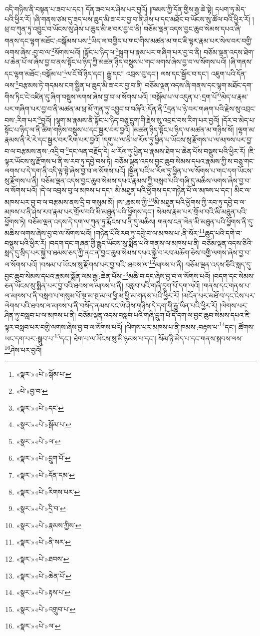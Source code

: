 འདི་གཉིས་ནི་བསྟན་པ་ཟབ་པ་དང་། དོན་ཟབ་པར་ཤེས་པར་བྱའོ། །ཁམས་ཀྱི་དོན་གྱིས་རྒྱ་ཆེ་སྟེ། དཔག་ཏུ་མེད་པའི་ཕྱིར་རོ། །ཞི་གནས་ཙམ་དུ་ཟད་པས་ཆུད་མི་ཟ་བར་བྱ་བ་ནི་ཤེས་པ་དང་མཐོང་བ་ཡོངས་སུ་ཚོལ་བའི་ཕྱིར་རོ། །ཕྲ་བ་ཀུན་ཏུ་འབྱུང་བ་ཡོངས་སུ་ཤེས་པ་ཆུད་མི་ཟ་བར་བྱ་བ་ནི། བཅོམ་ལྡན་འདས་བྱང་ཆུབ་སེམས་དཔའ་ཞི་གནས་དང་ལྷག་མཐོང་:བསྒོམས་པས་\footnote{«སྣར་»«པེ་»སྒོམ་པ་}ཡིད་ལ་བགྱིད་པ་གང་གིས་མཚན་མ་གང་ཇི་ལྟར་རྣམ་པར་སེལ་བར་བགྱི་ལགས་ཞེས་:བྱ་བ་ལ་\footnote{«པེ་»བྱ་བ་}སོགས་པའོ། །སྟོང་པ་ཉིད་ལ་\footnote{«སྣར་»«པེ་»དང་}སྐྲག་པ་རྣམ་པར་གཞིག་པར་བྱ་བ་ནི། བཅོམ་ལྡན་འདས་ཐེག་པ་ཆེན་པོ་ལ་ཞེས་བྱ་བ་ནས་སྟོང་པ་ཉིད་ཀྱི་མཚན་ཉིད་བསྡུས་པ་གང་ལགས་ཞེས་བྱ་བ་ལ་སོགས་པའོ། །ཞི་གནས་དང་ལྷག་མཐོང་:བསྒོམ་པ་\footnote{«སྣར་»«པེ་»སྒོམ་པ་}ལ་ངོ་བོ་ཉིད་དང་། རྒྱུ་དང་། འབྲས་བུ་དང་། ལས་དང་སྦྱོར་བ་དང་། འཇུག་པའི་དོན་ལས་\footnote{«སྣར་»«པེ་»ལ་}བརྩམས་ཏེ་གདམས་ངག་སྦྱིན་པ་ཆུད་མི་ཟ་བར་བྱ་བ་ནི། བཅོམ་ལྡན་འདས་ཞི་གནས་དང་ལྷག་མཐོང་དག་གིས་ཏིང་ངེ་འཛིན་དུ་ཞིག་བསྡུས་ལགས་ཞེས་བྱ་བ་ལ་སོགས་པའོ། །བསྒོམ་པ་ལ་འདུན་པ་:དྲག་པོ་\footnote{«སྣར་»«པེ་»དྲུག་པོ་}མེད་པ་རྣམ་པར་གཞིག་པར་བྱ་བ་ནི་མཚན་མ་ཕྲ་མོ་ཀུན་ཏུ་འབྱུང་བ་བཞིའི་:དོན་ནི་\footnote{«སྣར་»«པེ་»དོན་དམ་}དྲན་པ་ཉེ་བར་གཞག་པའི་རྗེས་སུ་འབྲང་བས་:རིག་པར་\footnote{«སྣར་»«པེ་»རིགས་པར་}བྱའོ། །ལྷག་མ་རྣམས་ནི་སྟོང་པ་ཉིད་བཅུ་དྲུག་གི་རྗེས་སུ་འབྲང་བས་རིག་པར་བྱའོ། །དོར་བ་མེད་པ་སྟོང་པ་ཉིད་ལ་ནི་ཚིག་གཉིས་བསྡུས་པ་དང་སྦྱར་བར་བྱའོ། །མཚན་ཉིད་སྟོང་པ་ཉིད་ལ་མཚན་མ་གཉིས་སོ། །ལྷག་མ་རྣམས་ནི་རེ་རེ་དང་སྦྱར་བར་རིག་པར་བྱའོ། །དགུ་པ་ལ་ནི་ཕ་རོལ་ཏུ་ཕྱིན་པ་ཡོངས་སུ་རྫོགས་པ་ལ་མཁས་པར་བྱ་བ་ལ་བརྩམས་ནས་:འདྲི་བ་\footnote{«སྣར་»«པེ་»དྲི་བ་}དང་ལན་བརྗོད་དེ། ཕ་རོལ་ཏུ་ཕྱིན་པ་རྣམས་ཐེག་པ་ཆེན་པོས་བསྡུས་པའི་ཕྱིར་རོ། །ཇི་ལྟར་ཡོངས་སུ་རྫོགས་པ་ནི་ས་རབ་ཏུ་དབྱེ་བས་ཏེ། བཅོམ་ལྡན་འདས་བྱང་ཆུབ་སེམས་དཔའ་རྣམས་ཀྱི་ས་བཅུ་གང་ལགས་པ་དེ་དག་ནི་འདི་ལྟ་སྟེ་ཞེས་བྱ་བ་ལ་སོགས་པའོ། །སྦྱིན་པའི་ཕ་རོལ་ཏུ་ཕྱིན་པ་ལ་སོགས་པ་གང་དག་ཡོངས་སུ་རྫོགས་པ་ནི། བཅོམ་ལྡན་འདས་བྱང་ཆུབ་སེམས་དཔའ་རྣམས་ཀྱི་བསླབ་པའི་གཞི་དུ་མཆིས་ལགས་ཞེས་བྱ་བ་ལ་སོགས་པའོ། །དེ་ལ་འབྲས་བུ་ལ་མཁས་པ་དང་། མི་མཐུན་པའི་ཕྱོགས་དང་གཉེན་པོ་ལ་མཁས་པ་དང་། མིང་ལ་མཁས་པར་བྱ་བ་ལ་བརྩམས་ནས་དྲི་བ་གསུམ་མོ། །ས་:རྣམས་ཀྱི་\footnote{«སྣར་»«པེ་»རྣམས་ཀྱིས་}མི་མཐུན་པའི་ཕྱོགས་ཀྱི་རབ་ཏུ་དབྱེ་བ་ལ་མཁས་པ་ནི་ཤེས་རབ་རྣམ་པར་གྲོལ་བའི་མི་མཐུན་པའི་ཕྱོགས་དང་། སེམས་རྣམ་པར་གྲོལ་བའི་མི་མཐུན་པའི་ཕྱོགས་ཏེ། བཅོམ་ལྡན་འདས་དེ་དག་ལ་ཀུན་ཏུ་རྨོངས་པ་ནི་དུ་མཆིས། གནས་ངན་ལེན་མི་མཐུན་པའི་ཕྱོགས་ནི་དུ་མཆིས་ལགས་ཞེས་བྱ་བ་ལ་སོགས་པའོ། །གཉེན་པོའི་རབ་ཏུ་དབྱེ་བ་ལ་མཁས་པ་:ནི་སོར་\footnote{«སྣར་»«པེ་»ནི་སར་}ཆུད་པའི་དགེ་བ་བསྡུས་པའི་ཕྱིར་རོ། །བདག་དང་གཞན་གྱི་རྒྱུད་ཡོངས་སུ་སྨིན་པའི་གནས་ལ་མཁས་པ་ནི། བཅོམ་ལྡན་འདས་ཅིའི་སླད་དུ་སྲིད་པར་སྐྱེ་བ་ཐམས་ཅད་ཀྱི་ནང་ན་བྱང་ཆུབ་སེམས་དཔའ་སྐྱེ་བ་རབ་མཆོག་ཅེས་བགྱི་ལགས་ཞེས་བྱ་བ་ལ་སོགས་པའོ། །བསམ་པ་ཡོངས་སུ་རྫོགས་པར་བྱ་བའི་:ཐབས་ལ་\footnote{«སྣར་»«པེ་»ཐབས་}མཁས་པ་ནི། བཅོམ་ལྡན་འདས་ཅིའི་སླད་དུ་བྱང་ཆུབ་སེམས་དཔའ་རྣམས་སྨོན་ལམ་རྒྱ་:ཆེན་པོས་\footnote{«སྣར་»«པེ་»ཆེན་པོ་}མཆི་བ་དང་ཞེས་བྱ་བ་ལ་སོགས་པའོ། །བདག་དང་སེམས་ཅན་ཡོངས་སུ་སྨིན་པར་བྱ་བའི་ཐབས་ལ་མཁས་པ་ནི། བསླབ་པའི་གཞི་དྲུག་པོ་དག་ལའོ། །གནས་དང་གནས་པ་ལ་མཁས་པ་ནི་བསླབ་པ་གསུམ་པོ་སྔ་མ་སྔ་མ་ལ་ཕྱི་མ་ཕྱི་མ་གནས་པའི་ཕྱིར་རོ། །མངོན་པར་མཐོ་བ་དང་ངེས་པར་ལེགས་པའི་ཐབས་ལ་མཁས་པ་ནི་བསོད་ནམས་དང་ཡེ་ཤེས་གཉིས་དེ་དག་གི་རྒྱུ་ཡིན་པའི་ཕྱིར་རོ། །ལེགས་པར་ཤིན་ཏུ་བསླབ་པ་ལ་མཁས་པ་ནི། བཅོམ་ལྡན་འདས་བསླབ་པའི་གཞི་དྲུག་པོ་དེ་དག་ལ་བྱང་ཆུབ་སེམས་དཔའ་ཇི་ལྟར་བསླབ་པར་བགྱི་ལགས་ཞེས་བྱ་བ་ལ་སོགས་པའོ། །ལེགས་པར་མཁས་པ་ནི་ཁམས་:བརྟས་པ་\footnote{«སྣར་»«པེ་»རྟས་པ་}དང་། ཚོགས་ཡང་དག་པར་:སྒྲུབ་པ་\footnote{«སྣར་»«པེ་»འགྲུབ་པ་}དང་། ཐེག་པ་ལ་ཡོངས་སུ་མི་ཉམས་པ་དང་། སོམ་ཉི་མེད་པ་དང་གནས་སྐབས་ལས་\footnote{«སྣར་»«པེ་»ལ་}ཤེས་པར་བྱའོ། 
